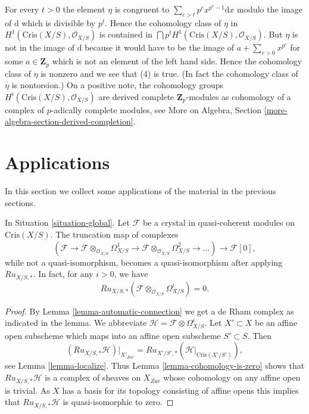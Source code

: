 \begin{example}
For every $t > 0$ the element $\eta$ is congruent to
$\sum_{e > t} p^e x^{p^e - 1}\text{d}x$ modulo the image of
$\text{d}$ which is divisible by $p^t$. Hence the cohomology
class of $\eta$ in $H^1(\text{Cris}(X/S), \mathcal{O}_{X/S})$
is contained in $\bigcap p^tH^1(\text{Cris}(X/S), \mathcal{O}_{X/S})$.
But $\eta$ is not in the image of $\text{d}$ because it would have
to be the image of $a + \sum_{e > 0} x^{p^e}$ for some $a \in \mathbf{Z}_p$
which is not an element of the left hand side.
Hence the cohomology class of $\eta$ is nonzero and we see that
(4) is true. (In fact the cohomology class of $\eta$ is nontorsion.)
On a positive note, the cohomology groups
$H^i(\text{Cris}(X/S), \mathcal{O}_{X/S})$
are derived complete $\mathbf{Z}_p$-modules as cohomology of
a complex of $p$-adically complete modules, see
More on Algebra, Section \ref{more-algebra-section-derived-completion}.
\end{example}








\section{Applications}
\label{section-applications}

\noindent
In this section we collect some applications of the material in
the previous sections.

\begin{proposition}
\label{proposition-compare-with-de-Rham}
In Situation \ref{situation-global}.
Let $\mathcal{F}$ be a crystal in quasi-coherent modules on
$\text{Cris}(X/S)$. The truncation map of complexes
$$
(\mathcal{F} \to
\mathcal{F} \otimes_{\mathcal{O}_{X/S}} \Omega^1_{X/S} \to
\mathcal{F} \otimes_{\mathcal{O}_{X/S}} \Omega^2_{X/S} \to \ldots)
\longrightarrow \mathcal{F}[0],
$$
while not a quasi-isomorphism, becomes a quasi-isomorphism after applying
$Ru_{X/S, *}$. In fact, for any $i > 0$, we have 
$$
Ru_{X/S, *}(\mathcal{F} \otimes_{\mathcal{O}_{X/S}} \Omega^i_{X/S}) = 0.
$$
\end{proposition}

\begin{proof}
By Lemma \ref{lemma-automatic-connection} we get a de Rham complex
as indicated in the lemma. We abbreviate
$\mathcal{H} = \mathcal{F} \otimes \Omega^i_{X/S}$.
Let $X' \subset X$ be an affine open
subscheme which maps into an affine open subscheme $S' \subset S$.
Then
$$
(Ru_{X/S, *}\mathcal{H})|_{X'_{Zar}} =
Ru_{X'/S', *}(\mathcal{H}|_{\text{Cris}(X'/S')}),
$$
see Lemma \ref{lemma-localize}. Thus
Lemma \ref{lemma-cohomology-is-zero}
shows that $Ru_{X/S, *}\mathcal{H}$ is a complex of sheaves on
$X_{Zar}$ whose cohomology on any affine open is trivial.
As $X$ has a basis for its topology consisting of affine opens
this implies that $Ru_{X/S, *}\mathcal{H}$ is quasi-isomorphic to zero.
\end{proof}


